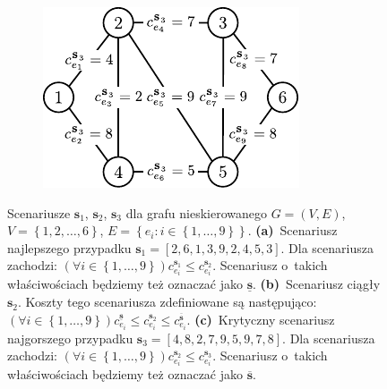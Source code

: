 \begin{figure}[!htbp]
\begin{subfigure}[b]{0.32\textwidth}
		\includegraphics[width=\textwidth]{Chapter_II/SCENARIO-example/c}
		\caption{}
		\label{fig:scenarioExample:c}
	\end{subfigure}
	\hfill\null
	\caption{
		Scenariusze $\textbf{s}_{1}$, $\textbf{s}_{2}$, $\textbf{s}_{3}$ dla grafu nieskierowanego $G = \left( V, E \right)$, $V = \left\{ 1, 2, \dots, 6 \right\}$, $E = \left\{ e_{i} : i \in \left\{ 1, \dots, 9 \right\} \right\}$.
		\textbf{(a)}~Scenariusz najlepszego przypadku $\textbf{s}_{1} = \left[ 2, 6, 1, 3, 9, 2, 4, 5, 3 \right]$.
		Dla scenariusza zachodzi: $\left( \forall i \in \left\{ 1, \dots, 9 \right\} \right) c^{\textbf{s}_{1}}_{e_{i}} \leqslant c^{\textbf{s}_{2}}_{e_{i}}$.
		Scenariusz o~takich właściwościach będziemy też oznaczać jako $\underline{\textbf{s}}$.
		\textbf{(b)}~Scenariusz ciągły $\textbf{s}_{2}$.
		Koszty tego scenariusza zdefiniowane są następująco: $\left( \forall i \in \left\{ 1, \dots, 9 \right\} \right) c^{\underline{\textbf{s}}}_{e_{i}} \leqslant c^{\textbf{s}_{2}}_{e_{i}} \leqslant c^{\overline{\textbf{s}}}_{e_{i}}$.
		\textbf{(c)}~Krytyczny scenariusz najgorszego przypadku $\textbf{s}_{3} = \left[ 4, 8, 2, 7, 9, 5, 9, 7, 8 \right]$.
		Dla scenariusza zachodzi: $\left( \forall i \in \left\{ 1, \dots, 9 \right\} \right) c^{\textbf{s}_{2}}_{e_{i}} \leqslant c^{\textbf{s}_{3}}_{e_{i}}$.
		Scenariusz o~takich właściwościach będziemy też oznaczać jako $\overline{\textbf{s}}$.
	}
	\label{fig:scenarioExample}
\end{figure}

